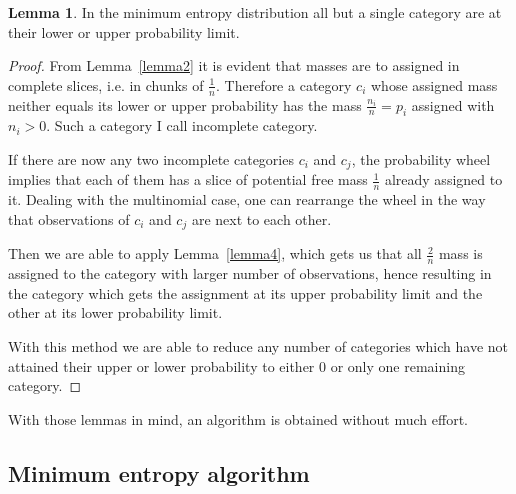 \documentclass[a4paper]{article}
\theoremstyle{definition} \newtheorem{lemma}{Lemma}
\theoremstyle{remark} \newtheorem{remark}{Remark}
\begin{document}
\begin{lemma}
\label{lemma4a}
In the minimum entropy distribution all but a single category are at their lower or upper probability limit.
\end{lemma}
\begin{proof}
From Lemma~\ref{lemma2} it is evident that masses are to assigned in complete slices, i.e. in chunks of $\frac{1}{n}$. Therefore a category $c_i$ whose assigned mass neither equals its lower or upper probability has the mass $\frac{n_i}{n} = p_i$ assigned with $n_i > 0$. Such a category I call incomplete category.

If there are now any two incomplete categories $c_i$ and $c_j$, the probability wheel implies that each of them has a slice of potential free mass $\frac{1}{n}$ already assigned to it. Dealing with the multinomial case, one can rearrange the wheel in the way that observations of $c_i$ and $c_j$ are next to each other.

Then we are able to apply Lemma~\ref{lemma4}, which gets us that all $\frac{2}{n}$ mass is assigned to the category with larger number of observations, hence resulting in the category which gets the assignment at its upper probability limit and the other at its lower probability limit.

With this method we are able to reduce any number of categories which have not attained their upper or lower probability to either 0 or only one remaining category. 
\end{proof}

With those lemmas in mind, an algorithm is obtained without much effort.

\subsection*{Minimum entropy algorithm}
\end{document}

